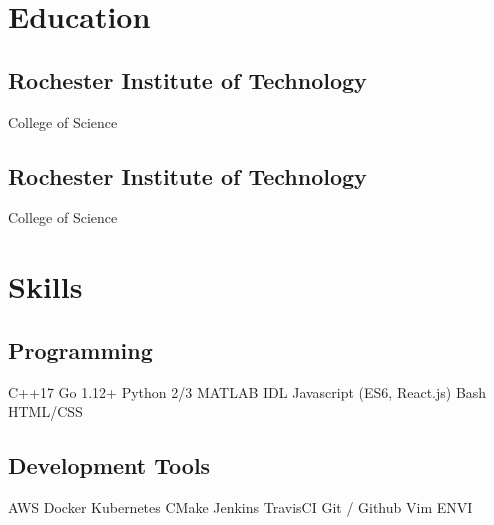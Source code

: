 \documentclass[]{nilosek-resume}
\begin{document}
%
%
\lastupdated

%
%

%
%

\begin{minipage}[t]{0.25\textwidth} 


\section{Education} 

\subsection{Rochester Institute of Technology}
\sectionsep
{}
College of  Science
\sectionsep

\subsection{Rochester Institute of Technology}
\sectionsep
{}
College of  Science
\sectionsep


\section{Skills}
\subsection{Programming}
C++17 \textbullet{} Go 1.12+ \textbullet{} Python 2/3 \textbullet{} MATLAB \textbullet{} IDL \textbullet{} Javascript (ES6, React.js) \textbullet{} Bash \textbullet{} HTML/CSS \\
\sectionsep
\subsection{Development Tools}
AWS \textbullet{} Docker \textbullet{} Kubernetes \textbullet{} CMake \textbullet{} Jenkins \textbullet{} TravisCI \textbullet{} Git / Github \textbullet{} Vim \textbullet{} ENVI \\
\sectionsep

\end{minipage}
\end{document}
